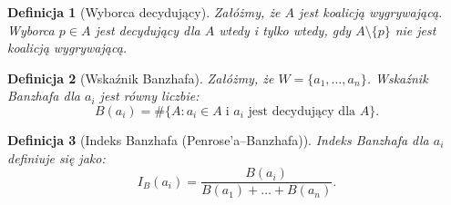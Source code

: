 \documentclass[12pt,a4paper]{article}
\theoremstyle{break}
\newtheorem{definition}{Definicja}[section]
\begin{document}
\begin{definition}[Wyborca decydujący]
	Załóżmy, że $A$ jest koalicją wygrywającą.  
	Wyborca $p \in A$ jest decydujący dla $A$ wtedy i tylko wtedy, gdy $A \setminus \{p\}$ nie jest koalicją wygrywającą.
\end{definition}

\begin{definition}[Wskaźnik Banzhafa]
	Załóżmy, że $W = \{a_1, \dots, a_n\}$.  
	Wskaźnik Banzhafa dla $a_i$ jest równy liczbie:
	$$B(a_i) = \# \{ A : a_i \in A \; \text{i $a_i$ jest decydujący dla $A$} \}.$$
\end{definition}

\begin{definition}[Indeks Banzhafa (Penrose’a–Banzhafa)]
	Indeks Banzhafa dla $a_i$ definiuje się jako:
	$$I_B(a_i) = \frac{B(a_i)}{B(a_1) + \dots + B(a_n)}.$$
\end{definition}
\end{document}
